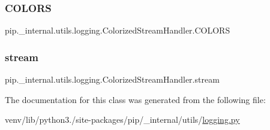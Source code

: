 \subsubsection{\texorpdfstring{C\+O\+L\+O\+RS}{COLORS}}
{\footnotesize\ttfamily pip.\+\_\+internal.\+utils.\+logging.\+Colorized\+Stream\+Handler.\+C\+O\+L\+O\+RS\hspace{0.3cm}{\ttfamily [static]}}

\mbox{\label{classpip_1_1__internal_1_1utils_1_1logging_1_1ColorizedStreamHandler_a10d6dd5ad74f65d0814bd61b16fdbd9c}} 
\subsubsection{\texorpdfstring{stream}{stream}}
{\footnotesize\ttfamily pip.\+\_\+internal.\+utils.\+logging.\+Colorized\+Stream\+Handler.\+stream}



The documentation for this class was generated from the following file\+:\begin{DoxyCompactItemize}
\item 
venv/lib/python3./site-\/packages/pip/\+\_\+internal/utils/\hyperlink{logging_8py}{logging.\+py}\end{DoxyCompactItemize}
